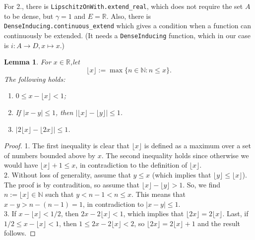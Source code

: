 \documentclass{article}
\newtheorem{lemma}[proposition]{Lemma}
\theoremstyle{definition}
\theoremstyle{step} \newtheorem{step}{Step}
\newcommand{\leanline}[1]{\texttt{#1}}%
\begin{document}
For 2., there is \leanline{LipschitzOnWith.extend_real}, which does
not require the set $A$ to be dense, but $\gamma=1$ and $E=\mathbb R$.
Also, there is \leanline{DenseInducing.continuous_extend} which gives
a condition when a function can continuously be extended. (It needs a
\leanline{DenseInducing} function, which in our case is $i : A \to D,
  x\mapsto x$.)


\begin{lemma}\label{l:gauss}
  For $x\in\mathbb R$,let
  $$ \lfloor x \rfloor := \max\{n \in \mathbb N: n\leq x\}.$$ The
  following holds:
  \begin{enumerate}
    \item $0\leq x - \lfloor x \rfloor < 1$;
    \item   If $|x-y| \leq 1$, then $|\lfloor x\rfloor - \lfloor y \rfloor| \leq
            1$.
    \item $|2 \lfloor x\rfloor - \lfloor 2x \rfloor| \leq 1$.
  \end{enumerate}
\end{lemma}

\begin{proof}
  1. The first inequality is clear that $\lfloor x\rfloor$ is defined
  as a maximum over a set of numbers bounded above by $x$. The second
  inequality holds since otherwise we would have $\lfloor x\rfloor + 1
    \leq x$, in contradiction to the definition of $\lfloor
    x\rfloor$. \\ 2. Without loss of generality, assume that $y\leq x$
  (which implies that $\lfloor y \rfloor \leq \lfloor x\rfloor$). The
  proof is by contradition, so assume that $\lfloor x\rfloor - \lfloor
    y \rfloor > 1$. So, we find $n := \lfloor x\rfloor\in\mathbb N$ such
  that $y < n-1 < n \leq x$. This means that $x-y > n - (n-1) = 1$, in
  contradiction to $|x-y| \leq 1$.  \\ 3.  If $x - \lfloor x\rfloor <
    1/2$, then $2x - 2 \lfloor x\rfloor < 1$, which implies that
  $\lfloor 2x\rfloor = 2\lfloor x\rfloor$. Last, if $1/2 \leq x -
    \lfloor x\rfloor < 1$, then $1 \leq 2x - 2\lfloor x\rfloor < 2$, so
  $\lfloor 2x\rfloor = 2\lfloor x\rfloor +1$ and the result follows.
\end{proof}
\end{document}

